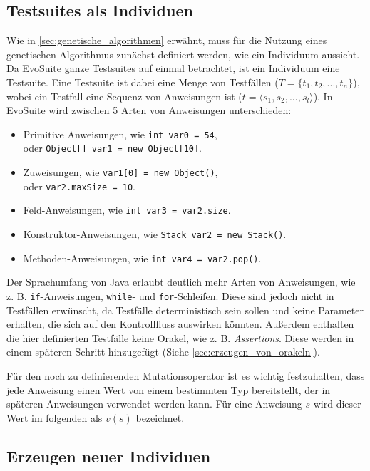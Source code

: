 \documentclass[a4paper,11pt]{article}
\begin{document}
\subsection{Testsuites als Individuen}

Wie in \cref{sec:genetische_algorithmen} erwähnt, muss für die Nutzung eines genetischen Algorithmus zunächst definiert werden, wie ein Individuum aussieht.
Da EvoSuite ganze Testsuites auf einmal betrachtet, ist ein Individuum eine Testsuite.
Eine Testsuite ist dabei eine Menge von Testfällen ($T = \{t_1, t_2, ..., t_n\}$), wobei ein Testfall eine Sequenz von Anweisungen ist ($t = \langle s_1, s_2, ..., s_l \rangle$).
In EvoSuite wird zwischen 5 Arten von Anweisungen unterschieden:
\begin{itemize}
	\item Primitive Anweisungen, wie \lstinline{int var0 = 54},\\
	oder \lstinline{Object[] var1 = new Object[10]}.
	\item Zuweisungen, wie \lstinline{var1[0] = new Object()},\\
	oder \lstinline{var2.maxSize = 10}.
	\item Feld-Anweisungen, wie \lstinline{int var3 = var2.size}.
	\item Konstruktor-Anweisungen, wie \lstinline{Stack var2 = new Stack()}.
	\item Methoden-Anweisungen, wie \lstinline{int var4 = var2.pop()}.
\end{itemize}
Der Sprachumfang von Java erlaubt deutlich mehr Arten von Anweisungen, wie z. B. \lstinline{if}-Anweisungen, \lstinline{while}- und \lstinline{for}-Schleifen.
Diese sind jedoch nicht in Testfällen erwünscht, da Testfälle deterministisch sein sollen und keine Parameter erhalten, die sich auf den Kontrollfluss auswirken könnten.
Außerdem enthalten die hier definierten Testfälle keine Orakel, wie z. B. \textit{Assertions}.
Diese werden in einem späteren Schritt hinzugefügt (Siehe \cref{sec:erzeugen_von_orakeln}).

Für den noch zu definierenden Mutationsoperator ist es wichtig festzuhalten, dass jede Anweisung einen Wert von einem bestimmten Typ bereitstellt, der in späteren Anweisungen verwendet werden kann.
Für eine Anweisung $s$ wird dieser Wert im folgenden als $v(s)$ bezeichnet.

\subsection{Erzeugen neuer Individuen}
\end{document}
